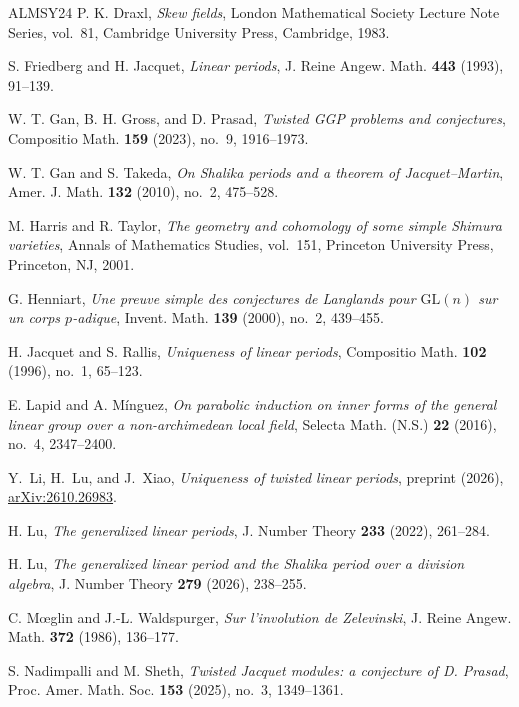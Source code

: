 \documentclass[11pt]{amsart}
\numberwithin{equation}{section}
\theoremstyle{plain}
\theoremstyle{definition}
\theoremstyle{remark}
\begin{document}
\begin{thebibliography}{ALMSY24}
	P. K. Draxl, \emph{Skew fields}, London Mathematical Society Lecture Note Series, vol.~81, Cambridge University Press, Cambridge, 1983.
	
	S. Friedberg and H. Jacquet, \emph{Linear periods}, J. Reine Angew. Math. \textbf{443} (1993), 91--139.
	
	W. T. Gan, B. H. Gross, and D. Prasad, \emph{Twisted GGP problems and conjectures}, Compositio Math. \textbf{159} (2023), no.~9, 1916--1973.
	
	W. T. Gan and S. Takeda, \emph{On Shalika periods and a theorem of Jacquet--Martin}, Amer. J. Math. \textbf{132} (2010), no.~2, 475--528.
	
	M. Harris and R. Taylor, \emph{The geometry and cohomology of some simple Shimura varieties}, Annals of Mathematics Studies, vol.~151, Princeton University Press, Princeton, NJ, 2001.
	
	G. Henniart, \emph{Une preuve simple des conjectures de Langlands pour $\mathrm{GL}(n)$ sur un corps $p$-adique}, Invent. Math. \textbf{139} (2000), no.~2, 439--455.
	
	H. Jacquet and S. Rallis, \emph{Uniqueness of linear periods}, Compositio Math. \textbf{102} (1996), no.~1, 65--123.
	
	E. Lapid and A. M\'inguez, \emph{On parabolic induction on inner forms of the general linear group over a non-archimedean local field}, Selecta Math. (N.S.) \textbf{22} (2016), no.~4, 2347--2400.
	
	Y.~Li, H.~Lu, and J.~Xiao,
	\emph{Uniqueness of twisted linear periods},
	preprint (2026), \href{https://arxiv.org/abs/2610.26983}{arXiv:2610.26983}.
	
	H. Lu, \emph{The generalized linear periods}, J. Number Theory \textbf{233} (2022), 261--284.
	
	H. Lu, \emph{The generalized linear period and the Shalika period over a division algebra}, J. Number Theory \textbf{279} (2026), 238--255.
	
	C. M\oe glin and J.-L. Waldspurger, \emph{Sur l'involution de Zelevinski}, J. Reine Angew. Math. \textbf{372} (1986), 136--177.
	
	S. Nadimpalli and M. Sheth, \emph{Twisted Jacquet modules: a conjecture of D. Prasad}, Proc. Amer. Math. Soc. \textbf{153} (2025), no.~3, 1349--1361.
	

\end{thebibliography}
\end{document}
